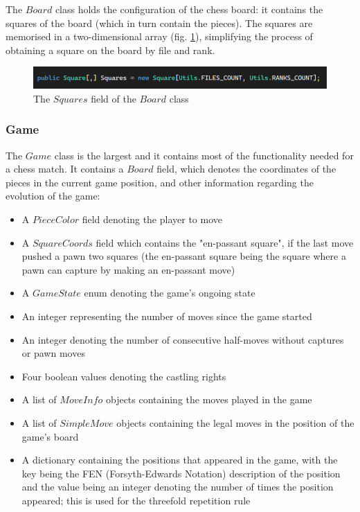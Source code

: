 The $Board$ class holds the configuration of the chess board: it contains the squares of the board (which in turn contain the pieces). The squares are memorised in a two-dimensional array (fig. \ref{fig:boardClassSquares}), simplifying the process of obtaining a square on the board by file and rank.

\begin{figure}[h]
    \centering
    \includegraphics[width=1\textwidth]{figures/board-class-squares.png}
    \caption{The $Squares$ field of the $Board$ class}
    \label{fig:boardClassSquares}
\end{figure}

\subsubsection{Game}
\label{subsubsec:ch5sec1subsec2subsubsec7}

The $Game$ class is the largest and it contains most of the functionality needed for a chess match. It contains a $Board$ field, which denotes the coordinates of the pieces in the current game position, and other information regarding the evolution of the game:

\begin{itemize}
    \item A $PieceColor$ field denoting the player to move
    \item A $SquareCoords$ field which contains the "en-passant square", if the last move pushed a pawn two squares (the en-passant square being the square where a pawn can capture by making an en-passant move)
    \item A $GameState$ enum denoting the game's ongoing state
    \item An integer representing the number of moves since the game started
    \item An integer denoting the number of consecutive half-moves without captures or pawn moves
    \item Four boolean values denoting the castling rights
    \item A list of $MoveInfo$ objects containing the moves played in the game
    \item A list of $SimpleMove$ objects containing the legal moves in the position of the game's board
    \item A dictionary containing the positions that appeared in the game, with the key being the FEN (Forsyth-Edwards Notation) \cite{fen-desc} description of the position and the value being an integer denoting the number of times the position appeared; this is used for the threefold repetition rule
\end{itemize}

